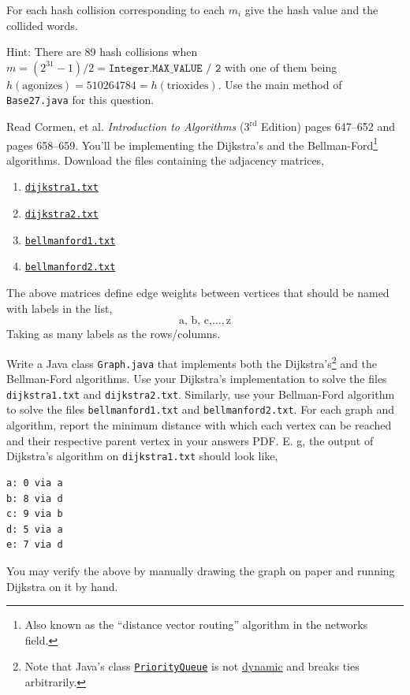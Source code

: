 \documentclass{homework}
\newcommand\providecode[1]{%
  \href{https://tashfeen.org/raw/share/ds/#1}{\texttt{#1}}
}
\begin{document}
For each hash collision corresponding to each $m_i$ give the hash
value and the collided words.

Hint: There are 89 hash collisions when
$m=(2^{31}-1)/2 = \texttt{Integer.MAX\_VALUE / 2}$ with one of them
being $h(\text{agonizes}) = 510264784 = h(\text{trioxides})$.  Use the
main method of \texttt{Base27.java} for this question.

\question Read Cormen, et al. \textit{Introduction to Algorithms}
($3^\text{rd}$ Edition) pages 647--652 and pages 658--659. You'll be
implementing the Dijkstra's and the Bellman-Ford\footnote{Also known
  as the ``distance vector routing'' algorithm in the networks field.}
algorithms. Download the files containing the adjacency matrices,

\begin{enumerate}
  \item \providecode{dijkstra1.txt}
  \item \providecode{dijkstra2.txt}
  \item \providecode{bellmanford1.txt}
  \item \providecode{bellmanford2.txt}
\end{enumerate}

The above matrices define edge weights between vertices that should be
named with labels in the list,
\[
  \text{a, b, c,} \hdots, \text{z}
\]
Taking as many labels as the rows/columns.

Write a Java class \texttt{Graph.java} that implements both the
Dijkstra's\footnote{Note that Java's class
  \href{https://docs.oracle.com/javase/8/docs/api/java/util/PriorityQueue.html}{\texttt{PriorityQueue}}
  is not \href{https://stackoverflow.com/q/2288241/12035739}{dynamic}
  and breaks ties arbitrarily.} and the Bellman-Ford algorithms. Use
your Dijkstra's implementation to solve the files
\texttt{dijkstra1.txt} and \texttt{dijkstra2.txt}. Similarly, use your
Bellman-Ford algorithm to solve the files \texttt{bellmanford1.txt}
and \texttt{bellmanford2.txt}. For each graph and algorithm, report
the minimum distance with which each vertex can be reached and their
respective parent vertex in your answers PDF. E. g, the output of
Dijkstra's algorithm on \texttt{dijkstra1.txt} should look like,

\begin{verbatim}
a: 0 via a
b: 8 via d
c: 9 via b
d: 5 via a
e: 7 via d
\end{verbatim}

You may verify the above by manually drawing the graph on paper and
running Dijkstra on it by hand.
\end{document}
